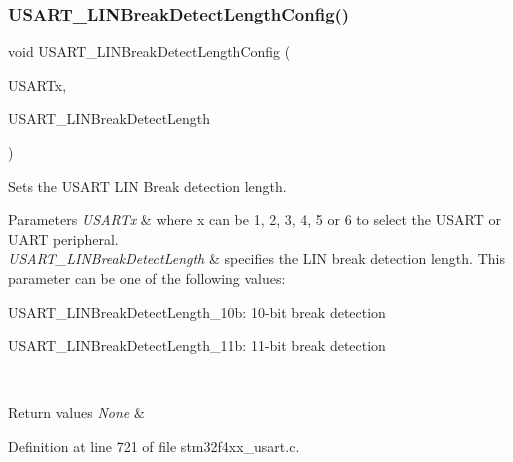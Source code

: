 \subsubsection{\texorpdfstring{U\+S\+A\+R\+T\+\_\+\+L\+I\+N\+Break\+Detect\+Length\+Config()}{USART\_LINBreakDetectLengthConfig()}}
{\footnotesize\ttfamily void U\+S\+A\+R\+T\+\_\+\+L\+I\+N\+Break\+Detect\+Length\+Config (\begin{DoxyParamCaption}\item[{\hyperlink{struct_u_s_a_r_t___type_def}{U\+S\+A\+R\+T\+\_\+\+Type\+Def} $\ast$}]{U\+S\+A\+R\+Tx,  }\item[{uint16\+\_\+t}]{U\+S\+A\+R\+T\+\_\+\+L\+I\+N\+Break\+Detect\+Length }\end{DoxyParamCaption})}



Sets the U\+S\+A\+RT L\+IN Break detection length. 


\begin{DoxyParams}{Parameters}
{\em U\+S\+A\+R\+Tx} & where x can be 1, 2, 3, 4, 5 or 6 to select the U\+S\+A\+RT or U\+A\+RT peripheral. \\
\hline
{\em U\+S\+A\+R\+T\+\_\+\+L\+I\+N\+Break\+Detect\+Length} & specifies the L\+IN break detection length. This parameter can be one of the following values\+: \begin{DoxyItemize}
\item U\+S\+A\+R\+T\+\_\+\+L\+I\+N\+Break\+Detect\+Length\+\_\+10b\+: 10-\/bit break detection \item U\+S\+A\+R\+T\+\_\+\+L\+I\+N\+Break\+Detect\+Length\+\_\+11b\+: 11-\/bit break detection \end{DoxyItemize}
\\
\hline
\end{DoxyParams}

\begin{DoxyRetVals}{Return values}
{\em None} & \\
\hline
\end{DoxyRetVals}


Definition at line 721 of file stm32f4xx\+\_\+usart.\+c.

\mbox{\label{group___u_s_a_r_t___group4_ga9fdd6296f4ca4acdfcbd58bf56bd4185}} 
